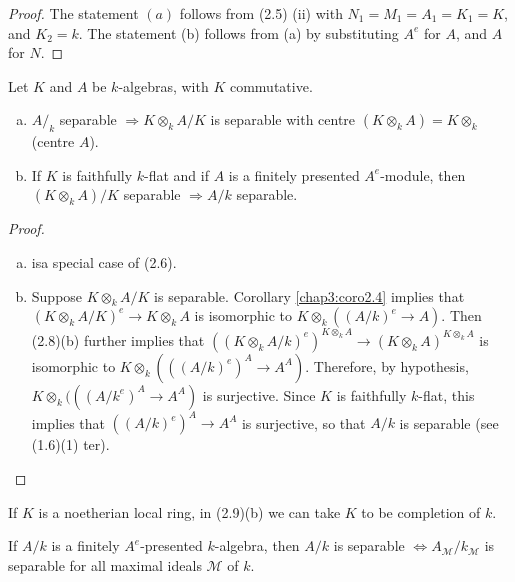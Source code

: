 \begin{proof}%
The statement $(a)$ follows from (2.5) (ii) with $N_1= M_1= A_1 = K_1
=K$, and $K_2 =k$. The statement (b) follows from (a) by substituting
$A^e$ for $A$, and $A$ for $N$.  
\end{proof}

\begin{coro}%
Let $K$ and $A$ be $k$-algebras, with $K$ commutative.
\begin{enumerate}[(a)]
\item $A/_k$ separable $\Rightarrow K \otimes_k A/K$ is separable with
  centre $(K \otimes_k A) = K \otimes_k$ (centre $A$). 

\item If  $K$ is faithfully $k$-flat and if $A$ is a finitely
  presented $A^e$-module, then $(K \otimes_k A)/K$ separable
  $\Rightarrow A/ k$ separable. 
\end{enumerate}
\end{coro}

\begin{proof}%
\begin{enumerate}[(a)]
\item is\pageoriginale a special case of (2.6).

\item Suppose $K \otimes_k A/K$ is separable. Corollary
  \ref{chap3:coro2.4} implies 
  that $(K \otimes_k A/K)^e \to K \otimes_k A$ is isomorphic to $K
  \otimes_k ((A/k)^e \to A)$. Then (2.8)(b) further implies that
  $((K \otimes_k A/k)^e)^{K \otimes_k A} \to (K \otimes_k
  A)^{K \otimes_k A}$ is isomorphic to $K \otimes_k ((( A/k)^e)^A \to
  A^A)$. Therefore, by hypothesis, $K \otimes_k ((( A/k^e)^A \to A^A)$
  is surjective. Since $K$ is faithfully $k$-flat, this implies that
  $((A/k)^e)^A \to A^A$ is surjective, so that $A/k$ is separable
  (see (1.6)(1) ter).  
\end{enumerate}
\end{proof}

\begin{example*}%
If $K$ is a noetherian local ring, in (2.9)(b) we can take $K$ to be
completion of $k$.  
\end{example*}

\begin{coro}\label{chap3:coro2.10} %
If $A/k$ is a finitely $A^e$-presented $k$-algebra, then $A/k$ is
separable $\Leftrightarrow A_{\mathscr{M}} / k_{\mathscr{M}}$  is
separable for all maximal ideals $\mathscr{M}$ of $k$. 
\end{coro}


